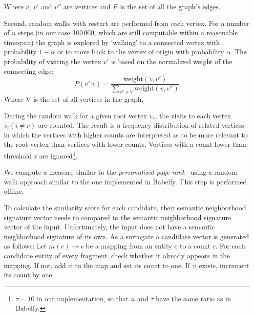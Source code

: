 \documentclass[runningheads,a4paper]{llncs}
\begin{document}
{Where $v$, $v'$ and $v''$ are vertices and $E$ is the set of all the graph's edges.

Second, random walks with restart are performed from each vertex. %
For a number of $n$ steps (in our case 100\,000, which are still computable within a reasonable timespan) the graph is explored by `walking' to a connected vertex with probability $1 - \alpha$ or to move back to the vertex of origin with probability $\alpha$. The probability of visiting the vertex $v'$ is based on the normalized weight of the connecting edge:
$$P(v'|v) = \frac{\mathrm{weight}(v, v')}{\sum\limits_{v''\in V} \mathrm{weight}(v, v'')}$$
Where V is the set of all vertices in the graph. 

During the random walk for a given root vertex $v_r$, the visits to each vertex $v_i (i \neq r)$ are counted. The result is a frequency distribution of related vertices in which the vertices with higher counts are interpreted as to be more relevant to the root vertex than vertices with lower counts. Vertices with a count lower than threshold $\tau$ are ignored\footnote{$\tau = 10$ in our implementation, so that $n$ and $\tau$ have the same ratio as in Babelfy.}.

We compute a measure similar to the \emph{personalized page rank}~\cite{personalized_page_rank} using a random walk approach similar to the one implemented in Babelfy. This step is performed offline.

To calculate the similarity score for each candidate, their semantic neighborhood signature vector needs to compared to the semantic neighborhood signature vector of the input. Unfortunately, the input does not have a semantic neighborhood signature of its own. As a surrogate a candidate vector is generated as follows: Let $m(e) \rightarrow c$ be a mapping from an entity $e$ to a count $c$. For each candidate entity of every fragment, check whether it already appears in the mapping. If not, add it to the map and set its count to one. If it exists, increment its count by one.

}
\end{document}
